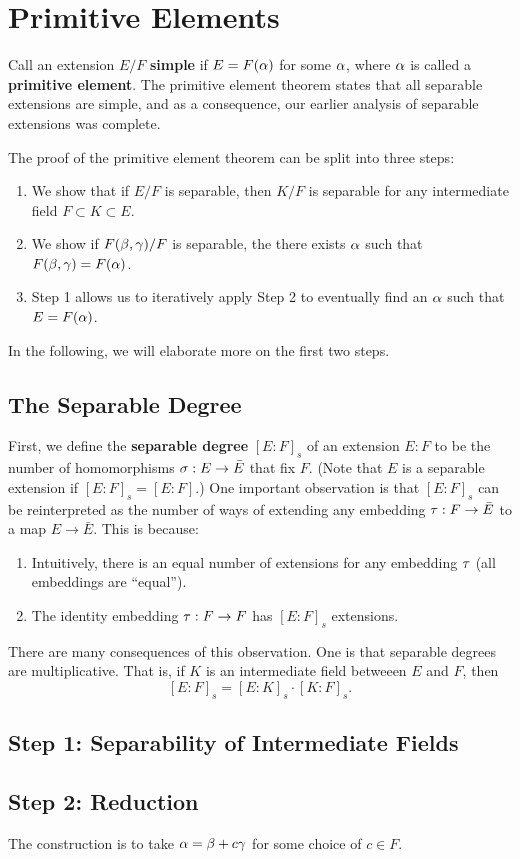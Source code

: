 \section{Primitive Elements}

Call an extension $E/F$ \textbf{simple} if $E = F(\alpha)$ for some $\alpha$, where $\alpha$ is called a \textbf{primitive element}. The primitive element theorem states that all separable extensions are simple, and as a consequence, our earlier analysis of separable extensions was complete.

The proof of the primitive element theorem can be split into three steps:
\begin{enumerate}
    \item We show that if $E/F$ is separable, then $K/F$ is separable for any intermediate field $F \subset K \subset E$.
    \item We show if $F(\beta, \gamma)/F$ is separable, the there exists $\alpha$ such that $F(\beta, \gamma) = F(\alpha)$.
    \item Step 1 allows us to iteratively apply Step 2 to eventually find an $\alpha$ such that $E = F(\alpha)$.
\end{enumerate}

In the following, we will elaborate more on the first two steps.

\subsection{The Separable Degree}
First, we define the \textbf{separable degree} $[E:F]_s$ of an extension $E:F$ to be the number of homomorphisms $\sigma: E \to \bar{E}$ that fix $F$. (Note that $E$ is a separable extension if $[E:F]_s = [E:F]$.) One important observation is that $[E:F]_s$ can be reinterpreted as the number of ways of extending any embedding $\tau: F \to \bar{E}$ to a map $E \to \bar{E}$. This is because:
\begin{enumerate}
    \item Intuitively, there is an equal number of extensions for any embedding $\tau$ (all embeddings are ``equal'').
    \item The identity embedding $\tau: F \to F$ has $[E:F]_s$ extensions.
\end{enumerate}

There are many consequences of this observation. One is that separable degrees are multiplicative. That is, if $K$ is an intermediate field betweeen $E$ and $F$, then
\[
    [E:F]_s = [E:K]_s \cdot [K:F]_s.
\]

\subsection{Step 1: Separability of Intermediate Fields}

\subsection{Step 2: Reduction}
The construction is to take $\alpha = \beta + c\gamma$ for some choice of $c \in F$.

